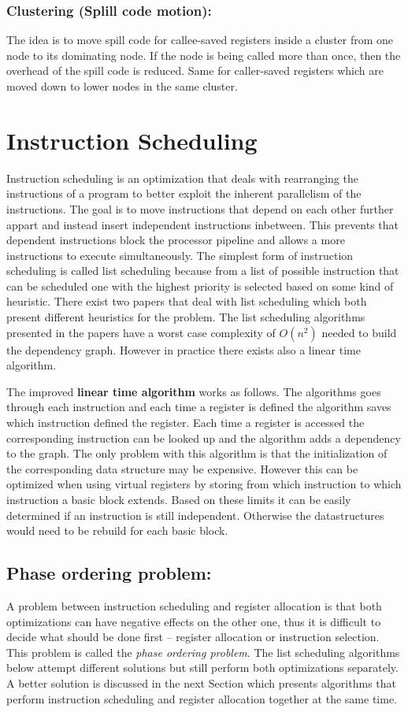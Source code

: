 \documentclass[a4paper,10pt]{article}
\begin{document}
\subsubsection*{Clustering (Splill code motion):}
The idea is to move spill code for callee-saved registers inside a cluster from one node to
its dominating node. If the node is being called more than once, then the overhead of the spill code is reduced. Same for caller-saved
registers which are moved down to lower nodes in the same cluster.

\section{Instruction Scheduling}
Instruction scheduling is an optimization that deals with rearranging the instructions of a program to better exploit the inherent
parallelism of the instructions. The goal is to move instructions that depend on each other further appart and instead insert independent
instructions inbetween. This prevents that dependent instructions block the processor pipeline and allows a more instructions to execute
simultaneously. The simplest form of instruction scheduling is called list scheduling because from a list of possible instruction that
can be scheduled one with the highest priority is selected based on some kind of heuristic. There exist two papers that deal with list
scheduling which both present different heuristics for the problem. The list scheduling algorithms presented in the papers have a worst
case complexity of $O(n^2)$ needed to build the dependency graph. However in practice there exists also a linear time algorithm.

The improved \textbf{linear time algorithm} works as follows. The algorithms goes through each instruction and each time a register is
defined the algorithm saves which instruction defined the register. Each time a register is accessed the corresponding instruction can be
looked up and the algorithm adds a dependency to the graph. The only problem with this algorithm is that the initialization of the
corresponding data structure may be expensive. However this can be optimized when using virtual registers by storing from which
instruction to which instruction a basic block extends. Based on these limits it can be easily determined if an instruction is still
independent. Otherwise the datastructures would need to be rebuild for each basic block.

\subsection{Phase ordering problem:}
A problem between instruction scheduling and register allocation is that both optimizations can have negative effects on the other one,
thus it is difficult to decide what should be done first -- register allocation or instruction selection. This problem is called the
\textit{phase ordering problem}. The list scheduling algorithms below attempt different solutions but still perform both optimizations
separately. A better solution is discussed in the next Section which presents algorithms that perform instruction scheduling and register
allocation together at the same time.
\end{document}
